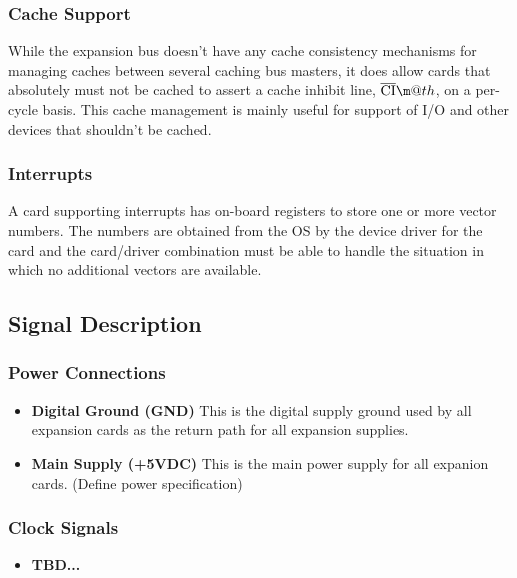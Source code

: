 \documentclass{article}
\makeatletter
\newcommand*{\textoverline}[1]{$\overline{\hbox{#1}}\m@th$}
\makeatother
\begin{document}
\subsubsection{Cache Support}

While the expansion bus doesn't have any cache consistency mechanisms for
managing caches between several caching bus masters, it does allow cards that
absolutely must not be cached to assert a cache inhibit line,
\textoverline{CI}, on a per-cycle basis. This cache management is mainly useful
for support of I/O and other devices that shouldn't be cached.

\subsubsection{Interrupts}

A card supporting interrupts has on-board registers to store one or more vector
numbers. The numbers are obtained from the OS by the device driver for the card
and the card/driver combination must be able to handle the situation in which no
additional vectors are available.

\subsection{Signal Description}

\subsubsection{Power Connections}

\begin{itemize}
	\item{\textbf{Digital Ground (GND)}} This is the digital supply ground
	used by all expansion cards as the return path for all expansion
	supplies.

	\item{\textbf{Main Supply (+5VDC)}} This is the main power supply for
	all expanion cards. (Define power specification)

\end{itemize}

\subsubsection{Clock Signals}

\begin{itemize}
	\item{\textbf{TBD...}}
\end{itemize}
\end{document}

